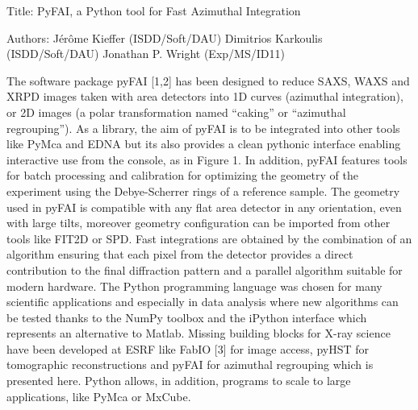 Title: PyFAI, a Python tool for Fast Azimuthal Integration

Authors: 	Jérôme Kieffer (ISDD/Soft/DAU)
		Dimitrios Karkoulis (ISDD/Soft/DAU)
		Jonathan P. Wright (Exp/MS/ID11)

The software package pyFAI [1,2] has been designed to reduce SAXS, WAXS and XRPD images taken with area detectors into 1D curves (azimuthal integration), or 2D images (a polar transformation named “caking” or “azimuthal regrouping”).
As a library, the aim of pyFAI is to be integrated into other tools like PyMca
and EDNA but its also provides a clean pythonic interface enabling interactive use from the console, as in Figure 1. In addition, pyFAI features tools for batch processing and calibration for optimizing the geometry of the experiment using the Debye-Scherrer rings of a reference sample.
The geometry used in pyFAI is compatible with any flat area detector in any orientation, even with large tilts, moreover geometry configuration can be imported from other tools like FIT2D or SPD. 
Fast integrations are obtained by the combination of an algorithm ensuring that
each pixel from the detector provides a direct contribution to the final
diffraction pattern and a parallel algorithm suitable for modern hardware.
The Python programming language was chosen for many scientific applications and especially in data analysis where new algorithms can be tested thanks to the NumPy toolbox and the iPython interface which represents an alternative to Matlab. 
Missing building blocks for X-ray science have been developed at ESRF like
FabIO [3] for image access, pyHST for tomographic reconstructions and
pyFAI for azimuthal regrouping which is presented here.
Python allows, in addition, programs to scale to large applications,
like PyMca or MxCube.

